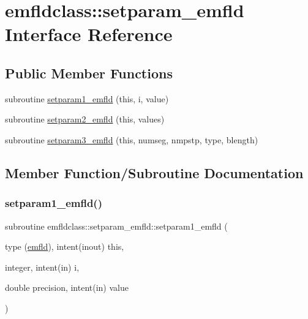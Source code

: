 \hypertarget{interfaceemfldclass_1_1setparam__emfld}{}\section{emfldclass\+::setparam\+\_\+emfld Interface Reference}
\label{interfaceemfldclass_1_1setparam__emfld}
\subsection*{Public Member Functions}
\begin{DoxyCompactItemize}
\item 
subroutine \mbox{\hyperlink{interfaceemfldclass_1_1setparam__emfld_af81c248566e448f5d7cf647e890d4a29}{setparam1\+\_\+emfld}} (this, i, value)
\item 
subroutine \mbox{\hyperlink{interfaceemfldclass_1_1setparam__emfld_afb0e96a0e5788aa271862d01ec1fc98f}{setparam2\+\_\+emfld}} (this, values)
\item 
subroutine \mbox{\hyperlink{interfaceemfldclass_1_1setparam__emfld_a044636428677fbc55c9213a08e835463}{setparam3\+\_\+emfld}} (this, numseg, nmpstp, type, blength)
\end{DoxyCompactItemize}


\subsection{Member Function/\+Subroutine Documentation}
\mbox{\label{interfaceemfldclass_1_1setparam__emfld_af81c248566e448f5d7cf647e890d4a29}} 
\subsubsection{\texorpdfstring{setparam1\_emfld()}{setparam1\_emfld()}}
{\footnotesize\ttfamily subroutine emfldclass\+::setparam\+\_\+emfld\+::setparam1\+\_\+emfld (\begin{DoxyParamCaption}\item[{type (\mbox{\hyperlink{namespaceemfldclass_structemfldclass_1_1emfld}{emfld}}), intent(inout)}]{this,  }\item[{integer, intent(in)}]{i,  }\item[{double precision, intent(in)}]{value }\end{DoxyParamCaption})}

